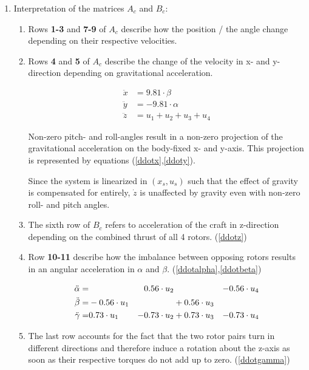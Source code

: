 \documentclass[11pt]{article}
\begin{document}
\begin{enumerate}
    \item Interpretation of the matrices $A_c$ and $B_c$:
    
    \begin{enumerate}
    \item
    Rows \textbf{1-3} and \textbf{7-9} of $A_c$ describe how the position / the angle change depending on their respective velocities.
        
    \item Rows \textbf{4} and \textbf{5} of $A_c$ describe the change of the velocity in x- and y-direction depending on gravitational acceleration.
    
    \begin{align}
    \ddot{x}&=9.81\cdot\beta \label{ddotx} \\
    \ddot{y}&=-9.81\cdot\alpha \label{ddoty} \\
    \ddot{z}&=u_1+u_2+u_3+u_4 \label{ddotz}
    \end{align}
    
	Non-zero pitch- and roll-angles result in a non-zero projection of the gravitational acceleration on the body-fixed x- and y-axis. This projection is represented by equations (\ref{ddotx},\ref{ddoty}).
	
Since the system is linearized in $(x_s,u_s)$ such that the effect of gravity is compensated for entirely, $\dot{z}$ is unaffected by gravity even with non-zero roll- and pitch angles.
	\item 
	The sixth row of $B_c$ refers to acceleration of the craft in z-direction depending on the combined thrust of all 4 rotors. (\ref{ddotz})
	\item Row \textbf{10-11} describe how the imbalance between opposing rotors results in an angular acceleration in $\alpha$ and $\beta$. (\ref{ddotalpha},\ref{ddotbeta})
	
	\begin{alignat}{6}
	\ddot{\alpha}=& & 0.56\cdot u_2 &\null &-0.56\cdot u_4 \label{ddotalpha} \\
	\ddot{\beta} = & -0.56\cdot u_1 &&+0.56\cdot u_3 &\label{ddotbeta} \\
	\ddot{\gamma}= & 0.73\cdot u_1&-0.73\cdot u_2&+0.73\cdot u_3&-0.73\cdot u_4 \label{ddotgamma}
	\end{alignat}
	
	\item The last row accounts for the fact that the two rotor pairs turn in different directions and therefore induce a rotation about the z-axis as soon as their respective torques do not add up to zero. (\ref{ddotgamma})
    \end{enumerate}
\end{enumerate}
\end{document}
